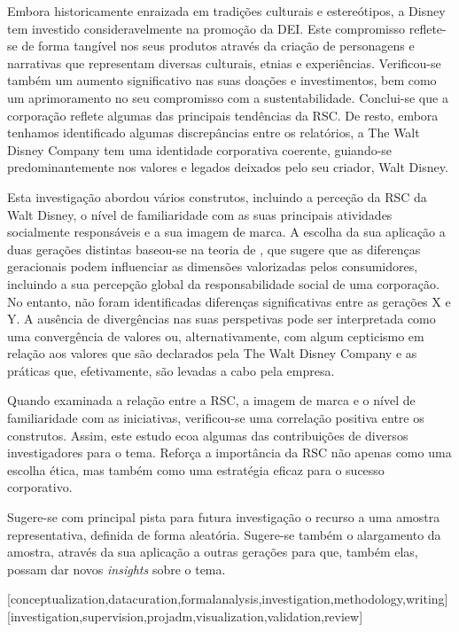\documentclass[portuguese]{textolivre}
\begin{document}
Embora historicamente enraizada em tradições culturais e estereótipos, a Disney tem investido consideravelmente na promoção da DEI. Este compromisso reflete-se de forma tangível nos seus produtos através da criação de personagens e narrativas que representam diversas culturais, etnias e experiências. Verificou-se também um aumento significativo nas suas doações e investimentos, bem como um aprimoramento no seu compromisso com a sustentabilidade. Conclui-se que a corporação reflete algumas das principais tendências da RSC. De resto, embora tenhamos identificado algumas discrepâncias entre os relatórios, a The Walt Disney Company tem uma identidade corporativa coerente, guiando-se predominantemente nos valores e legados deixados pelo seu criador, Walt Disney. 

Esta investigação abordou vários construtos, incluindo a perceção da RSC da Walt Disney, o nível de familiaridade com as suas principais atividades socialmente responsáveis e a sua imagem de marca. A escolha da sua aplicação a duas gerações distintas baseou-se na teoria de \textcite{wu_impact_2014}, que sugere que as diferenças geracionais podem influenciar as dimensões valorizadas pelos consumidores, incluindo a sua percepção global da responsabilidade social de uma corporação. No entanto, não foram identificadas diferenças significativas entre as gerações X e Y. A ausência de divergências nas suas perspetivas pode ser interpretada como uma convergência de valores ou, alternativamente, com algum cepticismo em relação aos valores que são declarados pela The Walt Disney Company e as práticas que, efetivamente, são levadas a cabo pela empresa. 

Quando examinada a relação entre a RSC, a imagem de marca e o nível de familiaridade com as iniciativas, verificou-se uma correlação positiva entre os construtos. Assim, este estudo ecoa algumas das contribuições de diversos investigadores para o tema. Reforça a importância da RSC não apenas como uma escolha ética, mas também como uma estratégia eficaz para o sucesso corporativo.

Sugere-se com principal pista para futura investigação o recurso a uma amostra representativa, definida de forma aleatória. Sugere-se também o alargamento da amostra, através da sua aplicação a outras gerações para que, também elas, possam dar novos \textit{insights} sobre o tema. 


\printbibliography\label{sec-bib}
\begin{contributors}
[conceptualization,datacuration,formalanalysis,investigation,methodology,writing]
[investigation,supervision,projadm,visualization,validation,review]
\end{contributors}
\end{document}
